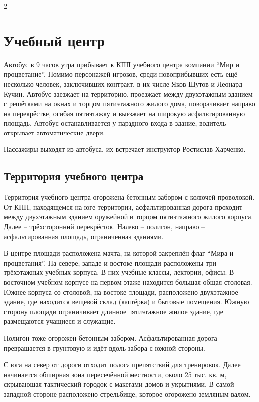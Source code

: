 \documentclass[twoside]{article}
\begin{document}
\begin{multicols}{2}
\raggedcolumns{}

\section{Учебный центр}\label{training-center}

Автобус в 9 часов утра прибывает к КПП учебного центра компании \enquote{Мир и
процветание}. Помимо персонажей игроков, среди новоприбывших есть ещё
несколько человек, заключивших контракт, в их числе Яков Шутов и Леонард
Кучин. Автобус заезжает на территорию, проезжает между двухэтажным
зданием с решётками на окнах и торцом пятиэтажного жилого дома,
поворачивает направо на перекрёстке, огибая пятиэтажку и выезжает на
широкую асфальтированную площадь. Автобус останавливается у парадного
входа в здание, водитель открывает автоматические двери.

Пассажиры выходят из автобуса, их встречает инструктор Ростислав
Харченко.

\subsection{Территория учебного центра}\label{training-grounds}

Территория учебного центра огорожена бетонным забором с колючей
проволокой. От КПП, находящемся на юге территории, асфальтированная
дорога проходит между двухэтажным зданием оружейной и торцом
пятиэтажного жилого корпуса. Далее -- трёхсторонний перекрёсток. Налево
-- полигон, направо -- асфальтированная площадь, ограниченная зданиями.

В центре площади расположена мачта, на которой закреплён флаг \enquote{Мира и
процветания}. На севере, западе и востоке площади расположены три
трёхэтажных учебных корпуса. В них учебные классы, лектории, офисы. В
восточном учебном корпусе на первом этаже находится большая общая
столовая. Южнее корпуса со столовой, на востоке площади, расположено
двухэтажное здание, где находится вещевой склад (каптёрка) и бытовые
помещения. Южную сторону площади ограничивает длинное пятиэтажное жилое
здание, где размещаются учащиеся и служащие.

Полигон тоже огорожен бетонным забором. Асфальтированная дорога
превращается в грунтовую и идёт вдоль забора с южной стороны.

С юга на север от дороги отходит полоса препятствий для тренировок.
Далее начинается обширная зона пересечённой местности, около 25 тыс. кв.
м, скрывающая тактический городок с макетами домов и укрытиями. В самой
западной стороне расположено стрельбище, которое огорожено земляным
валом.


\end{multicols}
\end{document}
